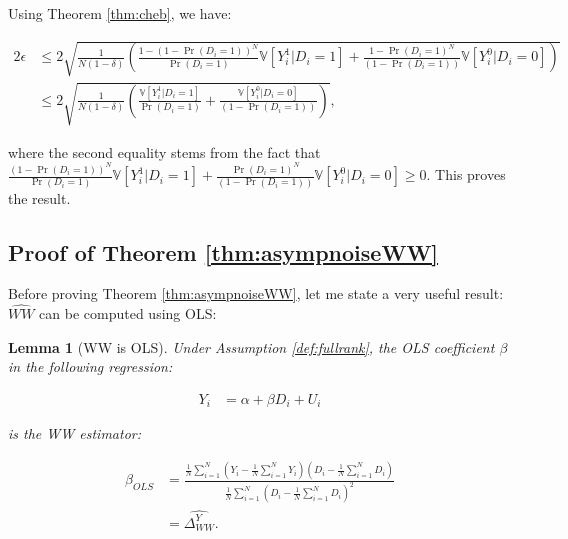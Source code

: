 \documentclass[
]{book}
\newcommand{\var}[1]{\mathbb{V}[ #1 ]}
\newtheorem{lemma}{Lemma}[chapter]
\theoremstyle{definition}
\theoremstyle{definition}
\theoremstyle{definition}
\theoremstyle{definition}
\theoremstyle{remark}
\begin{document}
Using Theorem \ref{thm:cheb}, we have:

\begin{align*}
2\epsilon & \leq 2\sqrt{\frac{1}{N(1-\delta)}\left(\frac{1-(1-\Pr(D_i=1))^N}{\Pr(D_i=1)}\var{Y_i^1|D_i=1}+\frac{1-\Pr(D_i=1)^N}{(1-\Pr(D_i=1))}\var{Y_i^0|D_i=0}\right)}\\
          & \leq 2\sqrt{\frac{1}{N(1-\delta)}\left(\frac{\var{Y_i^1|D_i=1}}{\Pr(D_i=1)}+\frac{\var{Y_i^0|D_i=0}}{(1-\Pr(D_i=1))}\right)},
\end{align*}

where the second equality stems from the fact that \(\frac{(1-\Pr(D_i=1))^N}{\Pr(D_i=1)}\var{Y_i^1|D_i=1}+\frac{\Pr(D_i=1)^N}{(1-\Pr(D_i=1))}\var{Y_i^0|D_i=0}\geq0\).
This proves the result.

\hypertarget{proofCLT}{%
\subsection{Proof of Theorem \ref{thm:asympnoiseWW}}\label{proofCLT}}

Before proving Theorem \ref{thm:asympnoiseWW}, let me state a very useful result: \(\hat{WW}\) can be computed using OLS:

\begin{lemma}[WW is OLS]
\protect\hypertarget{lem:WWOLS}{}{\label{lem:WWOLS} \iffalse (WW is OLS) \fi{} }Under Assumption \ref{def:fullrank}, the OLS coefficient \(\beta\) in the following regression:

\begin{align*}
        Y_i &  = \alpha +  \beta D_i + U_i
    \end{align*}

is the WW estimator:

\begin{align*}
\hat{\beta}_{OLS} & = \frac{\frac{1}{N}\sum_{i=1}^N\left(Y_i-\frac{1}{N}\sum_{i=1}^NY_i\right)\left(D_i-\frac{1}{N}\sum_{i=1}^ND_i\right)}{\frac{1}{N}\sum_{i=1}^N\left(D_i-\frac{1}{N}\sum_{i=1}^ND_i\right)^2} \\
                                & = \hat{\Delta^Y_{WW}}.
\end{align*}
\end{lemma}
\end{document}
